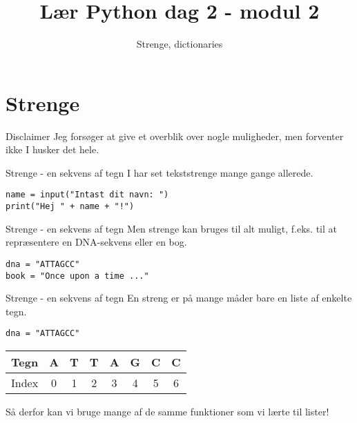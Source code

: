 \documentclass[main.tex]{subfiles}
\title{Lær Python dag 2 - modul 2}
\subtitle{Strenge, dictionaries}
\begin{document}
\maketitle


\section{Strenge}
\begin{frame}[fragile]{Disclaimer}
Jeg forsøger at give et overblik over nogle muligheder, men forventer ikke I husker det hele.

\end{frame}


\begin{frame}[fragile]{Strenge - en sekvens af tegn}
	I har set tekststrenge mange gange allerede.
	\begin{lstlisting}[style=python]
name = input("Intast dit navn: ")
print("Hej " + name + "!")
	\end{lstlisting}
\end{frame}

\begin{frame}[fragile]{Strenge - en sekvens af tegn}
	Men strenge kan bruges til alt muligt, f.eks. til at repræsentere en DNA-sekvens eller en bog.
	\begin{lstlisting}[style=python]
dna = "ATTAGCC"
book = "Once upon a time ..."
	\end{lstlisting}
\end{frame}

\begin{frame}[fragile]{Strenge - en sekvens af tegn}
	En streng er på mange måder bare en liste af enkelte tegn.
	\begin{lstlisting}[style=python]
dna = "ATTAGCC"
	\end{lstlisting}
	\begin{tabular}{|l|c|c|c|c|c|c|c|}
		\hline
		Tegn 	& A & T & T & A & G & C & C \\
		\hline
		Index 	& 0 & 1 & 2 & 3 & 4 & 5 & 6 \\
		\hline
	\end{tabular}
\pause

Så derfor kan vi bruge mange af de samme funktioner som vi lærte til lister!
\end{frame}
\end{document}
